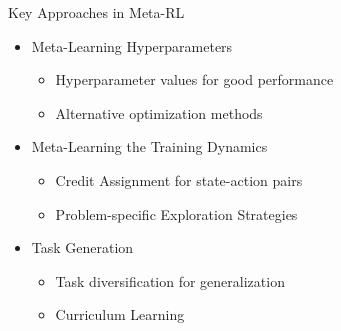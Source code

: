 \begin{frame}[c]{Key Approaches in Meta-RL}
	
	\begin{itemize}
		\item Meta-Learning Hyperparameters
		\begin{itemize}
			\item Hyperparameter values for good performance
			\item Alternative optimization methods
		\end{itemize}
		\item Meta-Learning the Training Dynamics
		\begin{itemize}
			\item Credit Assignment for state-action pairs
			\item Problem-specific Exploration Strategies
		\end{itemize}
		\item Task Generation
		\begin{itemize}
			\item Task diversification for generalization
			\item Curriculum Learning
		\end{itemize}
	\end{itemize}
	
	
\end{frame}

